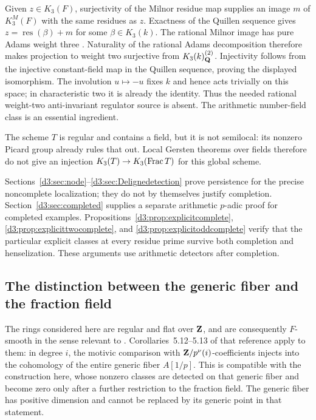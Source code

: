 Given $z\in K_3(F)$, surjectivity of the Milnor residue map
supplies an image $m$ of $K_3^M(F)$ with the same residues as
$z$. Exactness of the Quillen sequence gives
$z=\operatorname{res}(\beta)+m$ for some $\beta\in K_3(k)$.
The rational Milnor image has pure Adams weight three
\cite[IV, Example~5.9.1]{Weibel}.
Naturality of the rational Adams decomposition
\cite[IV, Theorem~5.11]{Weibel} therefore makes projection
to weight two surjective from $K_3(k)_{\mathbf Q}^{(2)}$.
Injectivity follows from the injective constant-field map in
the Quillen sequence, proving the displayed isomorphism.
The involution $u\mapsto-u$ fixes $k$ and hence acts trivially
on this space; in characteristic two it is already the identity.
Thus the needed rational weight-two anti-invariant regulator
source is absent. The arithmetic number-field class is an
essential ingredient.

The scheme $T$ is regular and contains a field, but it is not semilocal: its nonzero Picard group already rules that out. Local Gersten theorems over fields therefore do not give an injection $K_3(T)\to K_3(\operatorname{Frac} T)$ for this global scheme.

Sections~\ref{d3:sec:node}--\ref{d3:sec:Delignedetection} prove persistence for the precise noncomplete localization; they do not by themselves justify completion. Section~\ref{d3:sec:completed} supplies a separate arithmetic $p$-adic proof for completed examples. Propositions~\ref{d3:prop:explicitcomplete}, \ref{d3:prop:explicittwocomplete}, and \ref{d3:prop:explicitoddcomplete} verify that the particular explicit classes at every residue prime survive both completion and henselization. These arguments use arithmetic detectors after completion.

\subsection{The distinction between the generic fiber and the fraction field}
The rings considered here are regular and flat over $\mathbf Z$, and are consequently $F$-smooth in the sense relevant to \cite{BouisMotivic}. Corollaries~5.12--5.13 of that reference apply to them: in degree $i$, the motivic comparison with $\mathbf Z/p^\nu(i)$-coefficients injects into the cohomology of the entire generic fiber $A[1/p]$. This is compatible with the construction here, whose nonzero classes are detected on that generic fiber and become zero only after a further restriction to the fraction field. The generic fiber has positive dimension and cannot be replaced by its generic point in that statement.

